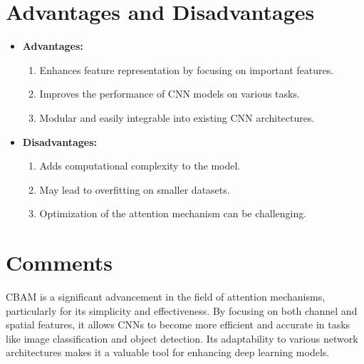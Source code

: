 \section{Advantages and Disadvantages}
\begin{itemize}
    \item \textbf{Advantages:}
    \begin{enumerate}
        \item Enhances feature representation by focusing on important features.
        \item Improves the performance of CNN models on various tasks.
        \item Modular and easily integrable into existing CNN architectures.
    \end{enumerate}
    \item \textbf{Disadvantages:}
    \begin{enumerate}
        \item Adds computational complexity to the model.
        \item May lead to overfitting on smaller datasets.
        \item Optimization of the attention mechanism can be challenging.
    \end{enumerate}
\end{itemize}

\section{Comments}
CBAM is a significant advancement in the field of attention mechanisms, particularly for its simplicity and effectiveness. By focusing on both channel and spatial features, it allows CNNs to become more efficient and accurate in tasks like image classification and object detection. Its adaptability to various network architectures makes it a valuable tool for enhancing deep learning models.
